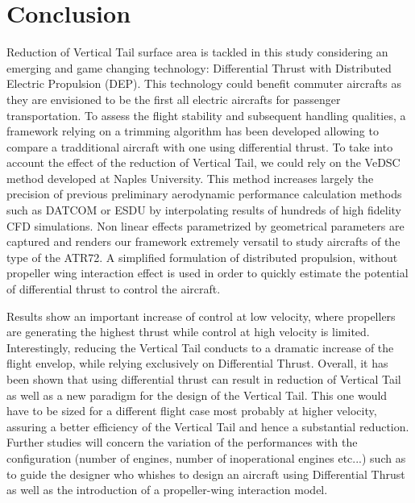 \documentclass[conf]{new-aiaa} %
\begin{document}





\clearpage



\clearpage





\section{Conclusion}
Reduction of Vertical Tail surface area is tackled in this study considering an emerging and game changing technology: Differential Thrust with Distributed Electric Propulsion (DEP). This technology could benefit commuter aircrafts as they are envisioned to be the first all electric aircrafts for passenger transportation. To assess the flight stability and subsequent handling qualities, a framework relying on a trimming algorithm has been developed allowing to compare a tradditional aircraft with one using differential thrust. To take into account the effect of the reduction of Vertical Tail, we could rely on the VeDSC method developed at Naples University. This method increases largely the precision of previous preliminary aerodynamic performance calculation methods such as DATCOM or ESDU by interpolating results of hundreds of high fidelity CFD simulations. Non linear effects parametrized by geometrical parameters are captured and renders our framework extremely versatil to study aircrafts of the type of the ATR72. A simplified formulation of distributed propulsion, without propeller wing interaction effect is used in order to quickly estimate the potential of differential thrust to control the aircraft. 

Results show an important increase of control at low velocity, where propellers are generating the highest thrust while control at high velocity is limited. Interestingly, reducing the Vertical Tail conducts to a dramatic increase of the flight envelop, while relying exclusively on Differential Thrust. Overall, it has been shown that using differential thrust can result in reduction of Vertical Tail as well as a new paradigm for the design of the Vertical Tail. This one would have to be sized for a different flight case most probably at higher velocity, assuring a better efficiency of the Vertical Tail and hence a substantial reduction.
Further studies will concern the variation of the performances with the configuration (number of engines, number of inoperational engines etc...) such as to guide the designer who whishes to design an aircraft using Differential Thrust as well as the introduction of a propeller-wing interaction model.
\end{document}
